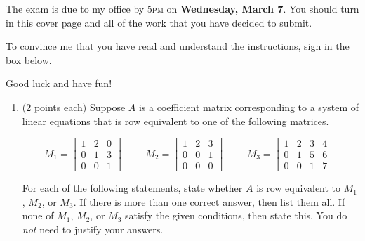 \documentclass[11pt]{article}
\theoremstyle{definition}
\begin{document}
The exam is due to my office by 5\textsc{pm} on \textbf{Wednesday, March 7}.  You should turn in this cover page and all of the work that you have decided to submit.

\bigskip

To convince me that you have read and understand the instructions, sign in the box below.

\bigskip


\bigskip

Good luck and have fun!

\newpage

\begin{enumerate}

\item (2 points each) Suppose $A$ is a coefficient matrix corresponding to a system of linear equations that is row equivalent to one of the following matrices.

\[M_1 = \begin{bmatrix}1 & 2 & 0 \\0 & 1 & 3 \\0 & 0 & 1\end{bmatrix} \hspace{1cm} M_2 = \begin{bmatrix}1 & 2 & 3 \\0 & 0 & 1 \\0 & 0 & 0\end{bmatrix}\hspace{1cm} M_3=\begin{bmatrix}1 & 2 & 3 & 4 \\0 & 1 & 5 & 6 \\0 & 0 & 1 & 7\end{bmatrix}\]

For each of the following statements, state whether $A$ is row equivalent to $M_1$, $M_2$, or $M_{3}$.  If there is more than one correct answer, then list them all.  If none of $M_1$, $M_2$, or $M_{3}$ satisfy the given conditions, then state this. You do \emph{not} need to justify your answers. 


\end{enumerate}
\end{document}
